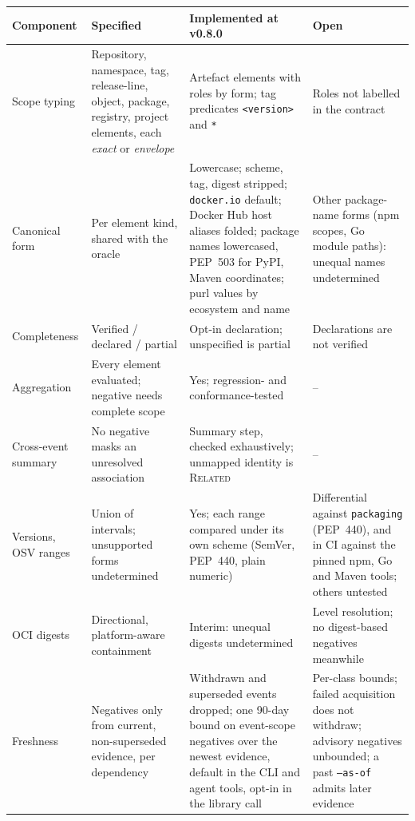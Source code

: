 \documentclass[11pt,a4paper]{article}
\newcommand{\code}[1]{\texttt{#1}}
\newcommand{\release}{v0.8.0}
\begin{document}
\begin{table}[t]
\centering
\footnotesize
\begin{tabularx}{\linewidth}{@{}>{\raggedright\arraybackslash}p{2.3cm} >{\raggedright\arraybackslash}X >{\raggedright\arraybackslash}p{3.3cm} >{\raggedright\arraybackslash}X@{}}
\toprule
Component & Specified & Implemented at \release{} & Open \\
\midrule
Scope typing & Repository, namespace, tag, release-line, object,
  package, registry, project elements, each \emph{exact} or
  \emph{envelope} & Artefact elements with roles by form; tag
  predicates \code{<version>} and \code{*} & Roles not labelled in the
  contract \\
Canonical form & Per element kind, shared with the oracle & Lowercase;
  scheme, tag, digest stripped; \code{docker.io} default; Docker Hub
  host aliases folded; package names lowercased, PEP~503 for PyPI,
  Maven coordinates; purl values by ecosystem and name & Other
  package-name forms (npm scopes, Go module paths): unequal names
  undetermined \\
Completeness & Verified / declared / partial & Opt-in declaration;
  unspecified is partial & Declarations are not verified \\
Aggregation & Every element evaluated; negative needs complete scope &
  Yes; regression- and conformance-tested & -- \\
Cross-event summary & No negative masks an unresolved association &
  Summary step, checked exhaustively; unmapped identity is
  \textsc{Related} & -- \\
Versions, OSV ranges & Union of intervals; unsupported forms
  undetermined & Yes; each range compared under its own scheme (SemVer,
  PEP~440, plain numeric) & Differential against \code{packaging}
  (PEP~440), and in CI against the pinned npm, Go and Maven tools;
  others untested \\
OCI digests & Directional, platform-aware containment & Interim:
  unequal digests undetermined & Level resolution; no digest-based
  negatives meanwhile \\
Freshness & Negatives only from current, non-superseded evidence, per
  dependency & Withdrawn and superseded events dropped; one 90-day
  bound on event-scope negatives over the newest evidence, default in
  the CLI and agent tools, opt-in in the library call & Per-class
  bounds; failed acquisition does not withdraw; advisory negatives
  unbounded; a past \code{--as-of} admits later evidence \\

\end{tabularx}
\end{table}
\end{document}
